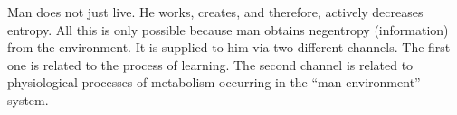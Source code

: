 Man does not just live. He works, creates, and therefore, actively decreases entropy. All this is only possible because man obtains negentropy (information) from the environment. It is supplied to him via two different channels. The first one is related to the process of learning. The second channel is related to physiological processes of metabolism occurring in the ``man-environment'' system.


